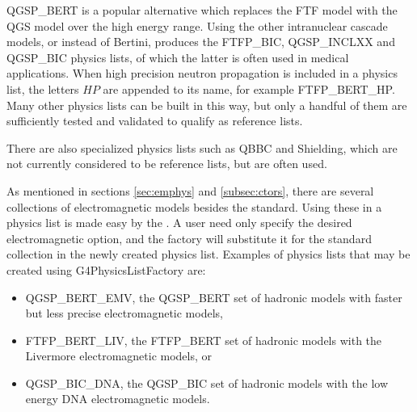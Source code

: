 QGSP\_BERT is a popular alternative which replaces the FTF model with the 
QGS model over the high energy range.  Using the other intranuclear cascade 
models,  or  instead of Bertini, 
produces the FTFP\_BIC, QGSP\_INCLXX and QGSP\_BIC physics lists, of which the
latter is often used in medical applications.  When high precision neutron 
propagation is included in a physics list, the letters $HP$ are appended to its 
name, for example FTFP\_BERT\_HP.  Many other physics lists can be built in 
this way, but only a handful of them are sufficiently tested and validated to
qualify as reference lists.

There are also specialized physics lists such as QBBC \cite{bib:QBBC} and 
Shielding, which are not currently considered to be reference lists, but are 
often used.

As mentioned in sections \ref{sec:emphys} and \ref{subsec:ctors}, there are 
several collections of electromagnetic models besides the standard.  Using these
in a physics list is made easy by the .  A user 
need only specify the desired electromagnetic option, and the factory will 
substitute it for the standard collection in the newly created physics list.  
Examples of physics lists that may be created using G4PhysicsListFactory are:
\begin{itemize}
\item QGSP\_BERT\_EMV, the QGSP\_BERT set of hadronic models with faster but
      less precise electromagnetic models,
\item FTFP\_BERT\_LIV, the FTFP\_BERT set of hadronic models with the Livermore
      electromagnetic models, or
\item QGSP\_BIC\_DNA, the QGSP\_BIC set of hadronic models with the low energy
      DNA electromagnetic models.
\end{itemize}

